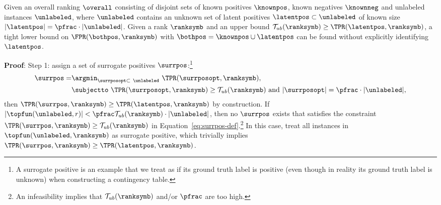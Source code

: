 

\begin{theorem} \label{main-theorem}
Given an overall ranking $\overall$ consisting of disjoint sets of known positives $\knownpos$, known negatives $\knownneg$ and unlabeled instances $\unlabeled$, where $\unlabeled$ contains an unknown set of latent positives $\latentpos \subset \unlabeled$ of known size $|\latentpos| = \pfrac \cdot|\unlabeled|$. Given a rank $\ranksymb$ and an upper bound $\mathcal{T}_{ub}(\ranksymb) \geq \TPR(\latentpos, \ranksymb)$, a tight lower bound on $\FPR(\bothpos, \ranksymb)$ with $\bothpos = \knownpos \cup \latentpos$ can be found without explicitly identifying $\latentpos$.


\textbf{Proof}: Step 1: assign a set of surrogate positives $\surrpos$:\footnote{A surrogate positive is an example that we treat as if its ground truth label is positive (even though in reality its ground truth label is unknown) when constructing a contingency table.}
\begin{align}
\surrpos = &\argmin_{\surrposopt\subset\ \unlabeled}\ \TPR(\surrposopt, \ranksymb), \label{eq:surrpos-def}  \\ 
&\subjectto\ \TPR(\surrposopt,\ranksymb) \geq \mathcal{T}_{ub}(\ranksymb) \text{ and } |\surrposopt|=\pfrac\cdot|\unlabeled|, \nonumber
\end{align}
then $\TPR(\surrpos,\ranksymb) \geq \TPR(\latentpos,\ranksymb)$ by construction. If $|\topfun(\unlabeled, r)| < \pfrac\mathcal{T}_{ub}(\ranksymb)\cdot |\unlabeled|$, then no $\surrpos$ exists that satisfies the constraint $\TPR(\surrpos, \ranksymb) \geq \mathcal{T}_{ub}(\ranksymb)$ in Equation~\eqref{eq:surrpos-def}.\footnote{An infeasibility implies that $\mathcal{T}_{ub}(\ranksymb)$ and/or $\pfrac$ are too high.} In this case, treat all instances in $\topfun(\unlabeled, \ranksymb)$ as surrogate positive, which trivially implies $\TPR(\surrpos, \ranksymb) \geq \TPR(\latentpos, \ranksymb)$.


\end{theorem}
